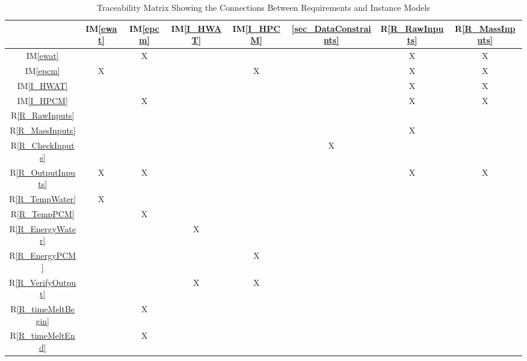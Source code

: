 \documentclass[12pt]{article}
\newcommand{\iref}[1]{IM\ref{#1}}
\newcommand{\rref}[1]{R\ref{#1}}
\begin{document}
\begin{table}[h!]
\centering
\begin{tabular}{|c|c|c|c|c|c|c|c|}
\hline
	& \iref{ewat}& \iref{epcm}& \iref{I_HWAT}& \iref{I_HPCM}& \ref{sec_DataConstraints}& \rref{R_RawInputs}& \rref{R_MassInputs} \\
\hline
\iref{ewat}            & & X& & & & X& X \\ \hline
\iref{epcm}            & X& & & X& & X& X \\ \hline
\iref{I_HWAT}          & & & & & & X& X \\ \hline
\iref{I_HPCM}          & & X& & & & X& X \\ \hline
\rref{R_RawInputs}     & & & & & & & \\ \hline
\rref{R_MassInputs}    & & & & & & X& \\ \hline
\rref{R_CheckInputs}   & & & & & X& & \\ \hline
\rref{R_OutputInputs}  & X& X& & & & X& X \\ \hline
\rref{R_TempWater}     & X& & & & & & \\ \hline 
\rref{R_TempPCM}       & & X& & & & & \\ \hline
\rref{R_EnergyWater}   & & & X& & & & \\ \hline
\rref{R_EnergyPCM}     & & & & X& & & \\ \hline
\rref{R_VerifyOutput}  & & & X& X& & & \\ \hline
\rref{R_timeMeltBegin} & & X& & & & & \\ \hline
\rref{R_timeMeltEnd}   & & X& & & & & \\ 
\hline
\end{tabular}
\caption{Traceability Matrix Showing the Connections Between Requirements and Instance Models}
\label{Table:R_trace}
\end{table}
\end{document}

